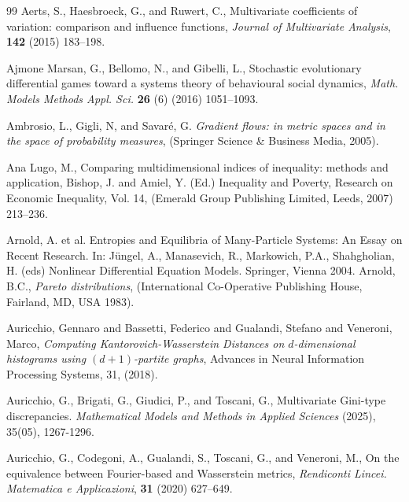 \documentclass{article}
\begin{document}
\begin{thebibliography}{99}
Aerts, S., Haesbroeck, G., and Ruwert, C., 
Multivariate coefficients of variation: comparison and influence functions, 
\textit{Journal of Multivariate Analysis}, \textbf{142} (2015)  183--198.



Ajmone Marsan, G., Bellomo, N., and Gibelli, L., 
Stochastic evolutionary differential games toward a systems theory of behavioural social dynamics,
\emph{Math. Models Methods Appl. Sci.} \textbf{26} (6) (2016) 1051--1093. 










Ambrosio, L., Gigli, N, and Savar{\'e}, G. 
\emph{Gradient flows: in metric spaces and in the space of probability measures},
 (Springer Science \& Business Media, 2005).
 
Ana Lugo, M., Comparing multidimensional indices of inequality: methods and application, Bishop, J. and Amiel, Y. (Ed.) Inequality and Poverty, Research on Economic Inequality, Vol. 14, (Emerald Group Publishing Limited, Leeds, 2007) 213--236.

Arnold, A. et al.  Entropies and Equilibria of Many-Particle Systems: An Essay on Recent Research. In: Jüngel, A., Manasevich, R., Markowich, P.A., Shahgholian, H. (eds) Nonlinear Differential Equation Models. Springer, Vienna 2004.
Arnold, B.C., \textit{Pareto distributions}, (International Co-Operative Publishing House, Fairland, MD, USA 1983).

Auricchio, Gennaro and Bassetti, Federico and Gualandi, Stefano and Veneroni, Marco, \textit{Computing Kantorovich-Wasserstein Distances on $ d $-dimensional histograms using $(d+ 1) $-partite graphs}, Advances in Neural Information Processing Systems, 31, (2018).


Auricchio, G., Brigati, G., Giudici, P., and  Toscani, G., Multivariate Gini-type discrepancies. \emph{Mathematical Models and Methods in Applied Sciences} (2025), 35(05), 1267-1296. 

Auricchio, G., Codegoni, A., Gualandi, S., Toscani, G., and Veneroni, M.,
On the equivalence between Fourier-based and Wasserstein metrics, \textit{Rendiconti Lincei. Matematica e Applicazioni}, \textbf{31}  (2020) 627--649.


\end{thebibliography}
\end{document}
